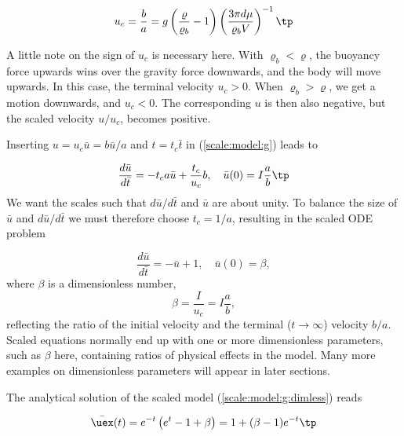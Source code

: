 \documentclass[graybox,envcountchap,sectrefs,final]{svmonodo}
\newenvironment{notice_mdfboxadmon}[1][]{
\begin{notice_mdfboxmdframed}[frametitle=#1]
}
{
\end{notice_mdfboxmdframed}
}
\begin{document}
\begin{equation}
u_c = \frac{b}{a} = g\left(\frac{\varrho}{\varrho_b} -1\right)\left(\frac{3\pi d\mu}{\varrho_b V}\right)^{-1}
\tp
\end{equation}


\begin{notice_mdfboxadmon}
A little note on the sign of $u_c$ is necessary here.
With $\varrho_b < \varrho$, the buoyancy force upwards wins over the
gravity force downwards, and the body will move upwards. In this case,
the terminal velocity $u_c > 0$. When $\varrho_b > \varrho$, we get
a motion downwards, and $u_c < 0$. The corresponding $u$ is then also
negative, but the scaled velocity $u/u_c$, becomes positive.
\end{notice_mdfboxadmon}




Inserting $u = u_c\bar u = b\bar u/a$ and $t=t_c\bar t$ in
(\ref{scale:model:g}) leads to

\[
\frac{d\bar u}{d\bar t} = -t_c a\bar u + \frac{t_c}{u_c}b,
\quad \bar u(0) = I\frac{a}{b}
\tp
\]
We want the scales such that $d\bar u/d\bar t$ and $\bar u$ are
about unity.
To balance the size of $\bar u$ and $d\bar u/d\bar t$ we must
therefore choose
$t_c = 1/a$, resulting in the scaled ODE problem

\begin{equation}
\frac{d\bar u}{d\bar t} = -\bar u + 1,\quad \bar u(0)=\beta,
\label{scale:model:g:dimless}
\end{equation}
where $\beta$ is a dimensionless number,
\begin{equation}
\beta = \frac{I}{u_c} = I\frac{a}{b},
\end{equation}
reflecting the ratio of the initial velocity and the
terminal ($t\rightarrow \infty$) velocity $b/a$.
Scaled equations normally end up with one or more dimensionless parameters,
such as $\beta$ here, containing ratios of physical effects in
the model. Many more examples on dimensionless parameters will appear
in later sections.

The analytical solution of the scaled model
(\ref{scale:model:g:dimless}) reads

\begin{equation}
\bar\uex(t) =
e^{-t}\left( e^{t}-1 + \beta\right) = 1 + (\beta -1)e^{-t}\tp
\label{scale:model:g:exact_scaled}
\end{equation}
\end{document}

